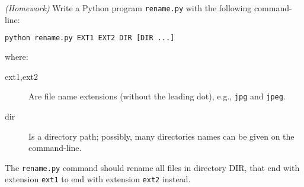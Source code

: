 \documentclass[english,serif,mathserif,xcolor=pdftex,dvipsnames,table]{beamer}
\begin{document}
\begin{frame}[fragile]
  \begin{exercise}\emph{(Homework)}
    Write a Python program \texttt{rename.py} with the following
    command-line:
\begin{lstlisting}[language=sh]
python rename.py EXT1 EXT2 DIR [DIR ...]
\end{lstlisting}
    where:
    \begin{description}
    \item[ext1,ext2] Are file name extensions (without the leading
      dot), e.g., \texttt{jpg} and \texttt{jpeg}.
    \item[dir] Is a directory path; possibly, many directories names can
      be given on the command-line.
    \end{description}

    The \texttt{rename.py} command should rename all files in
    directory DIR, that end with extension \texttt{ext1} to end with
    extension \texttt{ext2} instead.
  \end{exercise}
\end{frame}
\end{document}
